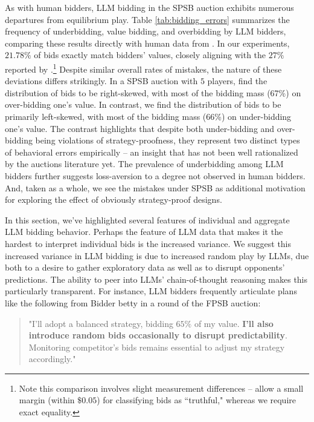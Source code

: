 \documentclass{article} %
\begin{document}
 As with human bidders, LLM bidding in the SPSB auction exhibits numerous departures from equilibrium play. Table \ref{tab:bidding_errors} summarizes the frequency of underbidding, value bidding, and overbidding by LLM bidders, comparing these results directly with human data from \citet{kagel1993independent}. In our experiments, $21.78\%$ of bids exactly match bidders' values, closely aligning with the $27\%$ reported by \citet{kagel1993independent}.\footnote{Note this comparison involves slight measurement differences -- \citet{kagel1993independent} allow a small margin (within $\$0.05$) for classifying bids as ``truthful," whereas we require exact equality.} Despite similar overall rates of mistakes, the nature of these deviations differs strikingly. In a SPSB auction with $5$ players, \citet{kagel1993independent} find the distribution of bids to be right-skewed, with most of the bidding mass (67\%) on over-bidding one's value. In contrast, we find the distribution of bids to be primarily left-skewed, with most of the bidding mass (66\%) on under-bidding one's value. The contrast highlights that despite both under-bidding and over-bidding being violations of strategy-proofness, they represent two distinct types of behavioral errors empirically -- an insight that has not been well rationalized by the auctions literature yet. The prevalence of underbidding among LLM bidders further suggests loss-aversion to a degree not observed in human bidders. And, taken as a whole, we see the mistakes under SPSB as additional motivation for exploring the effect of obviously strategy-proof designs.

In this section, we've highlighted several features of individual and aggregate LLM bidding behavior. Perhaps the feature of LLM data that makes it the hardest to interpret individual bids is the increased variance. We suggest this increased variance in LLM bidding is due to increased random play by LLMs, due both to a desire to gather exploratory data as well as to disrupt opponents' predictions. The ability to peer into LLMs' chain-of-thought reasoning makes this particularly transparent. For instance, LLM bidders frequently articulate plans like the following from Bidder betty in a round of the FPSB auction: 


\begin{quote}
    "I'll adopt a balanced strategy, bidding $65\%$ of my value. \textbf{I'll also introduce random bids occasionally to disrupt predictability}. Monitoring competitor's bids remains essential to adjust my strategy accordingly."
\end{quote}
\end{document}
